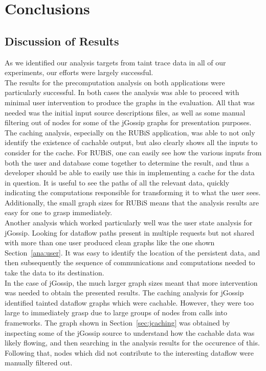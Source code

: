 \documentclass[msc,oneside]{ubcthesis}
\begin{document}
\chapter{Conclusions} %

\section{Discussion of Results}

As we identified our analysis targets from taint trace data in all of our experiments, our efforts were largely successful.\\

The results for the precomputation analysis on both applications were particularly successful. In both cases the analysis was able to proceed with minimal user intervention to produce the graphs in the evaluation. All that was needed was the initial input source descriptions files, as well as some manual filtering out of nodes for some of the jGossip graphs for presentation purposes.\\

The caching analysis, especially on the RUBiS application, was able to not only identify the existence of cachable output, but also clearly shows all the inputs to consider for the cache. For RUBiS, one can easily see how the various inputs from both the user and database come together to determine the result, and thus a developer should be able to easily use this in implementing a cache for the data in question. It is useful to see the paths of all the relevant data, quickly indicating the computations responsible for transforming it to what the user sees. Additionally, the small graph sizes for RUBiS means that the analysis results are easy for one to grasp immediately. \\

Another analysis which worked particularly well was the user state analysis for jGossip. Looking for dataflow paths present in multiple requests but not shared with more than one user produced clean graphs like the one shown Section~\ref{ana:user}. It was easy to identify the location of the persistent data, and then subsequently the sequence of communications and computations needed to take the data to its destination.\\

In the case of jGossip, the much larger graph sizes meant that more intervention was needed to obtain the presented results. The caching analysis for jGossip identified tainted dataflow graphs which were cachable. However, they were too large to immediately grasp due to large groups of nodes from calls into frameworks. The graph shown in Section~\ref{sec:jcaching} was obtained by inspecting some of the jGossip source to understand how the cachable data was likely flowing, and then searching in the analysis results for the occurence of this. Following that, nodes which did not contribute to the interesting dataflow were manually filtered out.\\
\end{document}
